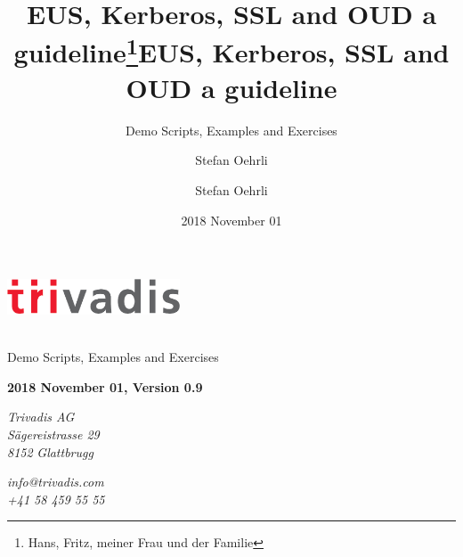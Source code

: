\documentclass[a4paper,,tablecaptionabove]{scrartcl}
\title{EUS, Kerberos, SSL and OUD a guideline\thanks{Hans, Fritz, meiner Frau und der Familie}}
\subtitle{Demo Scripts, Examples and Exercises}
\author{Stefan Oehrli}
\date{2018 November 01}
\title{EUS, Kerberos, SSL and OUD a guideline}
\author{Stefan Oehrli}
\begin{document}
  \begin{titlepage}
  
  \begin{flushleft}
  \end{flushleft}

      \begin{flushright}
      \includegraphics[width=5.12cm, right]{images/TVDLogo2019.eps}
    \end{flushright}
  
  \begin{flushright}
    \vfill
    \\
        \bigskip
      {\Large \textsf{Demo Scripts, Examples and Exercises}}\\
    
    \bigskip

    \begin{flushright}
      \textbf{ 
        2018 November 01,
        Version 0.9 }\\
    \end{flushright}
    \vfill
  \end{flushright}

  \begin{flushright}
     \textit{Trivadis AG\\} 
     \textit{Sägereistrasse 29\\} 
     \textit{8152} 
     \textit{Glattbrugg} 
    \par
  \end{flushright}

  \begin{flushright}
    
    
     \textit{info@trivadis.com\\} 
     \textit{+41 58 459 55 55\\} 
  \end{flushright}
  \end{titlepage}
\end{document}
